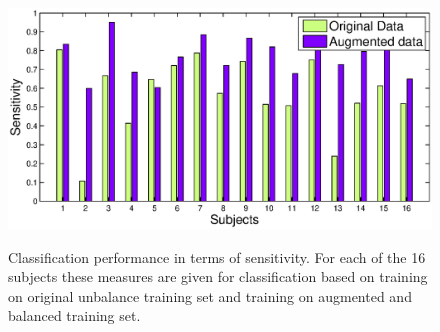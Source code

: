 \begin{figure}[ht!]
\centering
\includegraphics[width=1\columnwidth]{Figures/erp_sensitivity.eps}	
\label{fig:erp-sensitivity}
\caption{Classification performance in terms of %
sensitivity. %
For each of the 16 subjects these measures are given for classification based on training on original unbalance training set and training on augmented and balanced training set. 
} 
\label{fig:sensitivity-auc}
\end{figure} 


